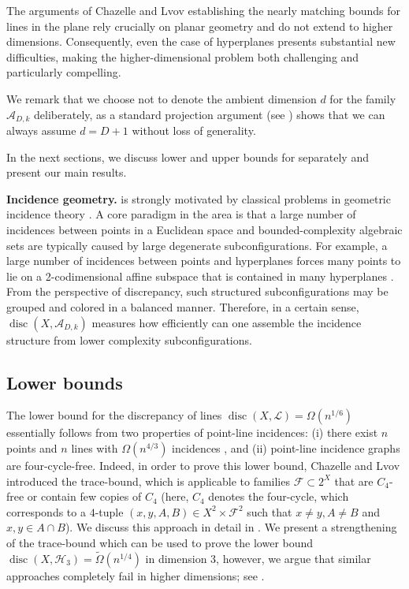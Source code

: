 \documentclass[11pt]{article}
\theoremstyle{plain}
\theoremstyle{definition}
\DeclareMathOperator{\disc}{disc}
\begin{document}
	The arguments of Chazelle and Lvov\cite{ChL} establishing the nearly matching bounds for lines in the plane rely crucially on planar geometry and do not extend to higher dimensions. Consequently, even the case of hyperplanes presents substantial new difficulties, making the higher-dimensional problem both challenging and particularly compelling. 
    
    We remark that we choose not to denote the ambient dimension $d$ for the family $\mathcal{A}_{D,k}$ deliberately, as a standard projection argument (see ) shows that we can always assume $d=D+1$ without loss of generality. 
    
    In the next sections, we discuss lower and upper bounds for  separately and present our main results.
	\medskip
	
	\noindent
	\textbf{Incidence geometry.}  is strongly motivated by classical problems in geometric incidence theory \cite{FPSSZ,GK,ST,SzT,TY}. A core paradigm in the area is that a large number of incidences between points in a Euclidean space and bounded-complexity algebraic sets are typically caused by large degenerate subconfigurations.  For example, a large number of incidences between points and hyperplanes forces many points to lie on a 2-codimensional affine subspace that is contained in many hyperplanes \cite{AS,MST}. From the perspective of discrepancy, such structured subconfigurations may be grouped and colored in a balanced manner. Therefore, in a certain sense, $\disc(X,\mathcal{A}_{D,k})$ measures how efficiently can one assemble the incidence structure from lower complexity subconfigurations.  
    
	
	\subsection{Lower bounds}
	
	The lower bound for the discrepancy of lines $\disc(X,\mathcal{L})=\Omega(n^{1/6})$ essentially follows from two properties of point-line incidences: (i) there exist $n$ points and $n$ lines with $\Omega(n^{4/3})$ incidences \cite{Erdos}, and (ii) point-line incidence graphs are four-cycle-free. Indeed, in order to prove this lower bound, Chazelle and Lvov \cite{ChL} introduced the trace-bound, which is applicable to families $\mathcal{F}\subset 2^X$ that are $C_4$-free or contain few copies of $C_4$ (here, $C_4$ denotes the four-cycle, which corresponds to a $4$-tuple $(x,y,A,B)\in X^2\times \mathcal F^2$ such that $x\neq y, A\neq B$ and $x,y\in A\cap B$). We discuss this approach in detail in . We present a strengthening of the trace-bound which can be used to prove the lower bound $\disc(X,\mathcal{H}_3)=\tilde{\Omega}(n^{1/4})$ in dimension 3, however, we argue that similar approaches completely fail in higher dimensions; see .
	
\end{document}

